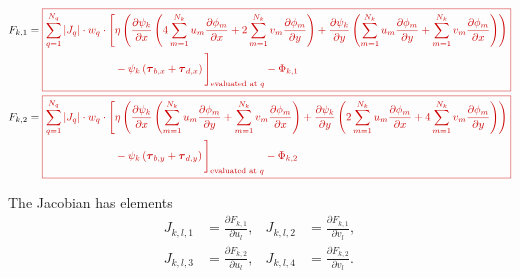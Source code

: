 \documentclass{amsart}
\newcommand{\T}{\boldsymbol{\tau}}
\newcommand{\diff}[2]{\ensuremath{\frac{\partial #1}{\partial #2}}}
\newcommand{\sumQ}{\ensuremath{\sum_{q = 1}^{N_q}}}
\newcommand{\diffbasisexpansion}[3]{\ensuremath{\sum_{#3 = 1}^{N_k} {#1}_{#3} \diff{\phi_{#3}}{#2} }}
\newcommand{\UX}{\diffbasisexpansion{u}{x}{m}}
\newcommand{\UY}{\diffbasisexpansion{u}{y}{m}}
\newcommand{\VX}{\diffbasisexpansion{v}{x}{m}}
\newcommand{\VY}{\diffbasisexpansion{v}{y}{m}}
\newcommand{\basalshearstress}[1]{\T_{b#1}}
\newcommand{\taubx}{\basalshearstress{,x}}
\newcommand{\tauby}{\basalshearstress{,y}}
\newcommand{\drivingstress}[1]{\T_{d#1}}
\newcommand{\taudx}{\drivingstress{,x}}
\newcommand{\taudy}{\drivingstress{,y}}
\newcommand{\highlight}[1]{{\color{red!80!black} \fbox{$ \displaystyle #1 $} }}
\begin{document}
\begin{align*}
  F_{k,1} &= \highlight{
            \begin{aligned}[t]
              \sumQ |J_q| \cdot w_q\cdot \Bigg[ &\eta \left(\diff{\psi_k}{x} \left(4 \UX + 2 \VY\right)
                + \diff{\psi_k}{y} \left(\UY + \VX\right)\right) \\
              & - \psi_k \left(\taubx + \taudx\right) \Bigg]_{\text{evaluated at } q} - \Phi_{k,1}\\
            \end{aligned} }\\
  F_{k,2} &= \highlight{
            \begin{aligned}[t]
              \sumQ |J_q| \cdot w_q\cdot \Bigg[ &\eta \left(\diff{\psi_k}{x} \left(\UY + \VX\right)
                + \diff{\psi_k}{y} \left(2 \UX + 4 \VY\right) \right) \\
              & - \psi_k \left(\tauby + \taudy\right) \Bigg]_{\text{evaluated at } q} - \Phi_{k,2}\\
            \end{aligned}}
\end{align*}

The Jacobian has elements
\begin{align*}
  J_{k,l,1} & = \diff{F_{k,1}}{u_l}, & J_{k,l,2} & = \diff{F_{k,1}}{v_l},\\
  J_{k,l,3} & = \diff{F_{k,2}}{u_l}, & J_{k,l,4} & = \diff{F_{k,2}}{v_l}.\\
\end{align*}
\end{document}

